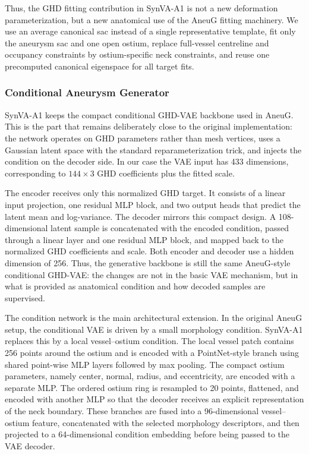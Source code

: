 Thus, the GHD fitting contribution in SynVA-A1 is not a new deformation
parameterization, but a new anatomical use of the AneuG fitting machinery. We
use an average canonical sac instead of a single representative template, fit
only the aneurysm sac and one open ostium, replace full-vessel centreline and
occupancy constraints by ostium-specific neck constraints, and reuse one
precomputed canonical eigenspace for all target fits.

\subsubsection{Conditional Aneurysm Generator}

SynVA-A1 keeps the compact conditional GHD-VAE backbone used in AneuG. This is
the part that remains deliberately close to the original implementation: the
network operates on GHD parameters rather than mesh vertices, uses a Gaussian
latent space with the standard reparameterization trick, and injects the
condition on the decoder side. In our case the VAE input has 433 dimensions,
corresponding to $144\times3$ GHD coefficients plus the fitted scale.

The encoder receives only this normalized GHD target. It consists of a linear
input projection, one residual MLP block, and two output heads that predict the
latent mean and log-variance. The decoder mirrors this compact design. A
108-dimensional latent sample is concatenated with the encoded condition,
passed through a linear layer and one residual MLP block, and mapped back to
the normalized GHD coefficients and scale. Both encoder and decoder use a
hidden dimension of 256. Thus, the generative backbone is still the same
AneuG-style conditional GHD-VAE: the changes are not in the basic VAE
mechanism, but in what is provided as anatomical condition and how decoded
samples are supervised.

The condition network is the main architectural extension. In the original
AneuG setup, the conditional VAE is driven by a small morphology condition.
SynVA-A1 replaces this by a local vessel--ostium condition. The local vessel
patch contains 256 points around the ostium and is encoded with a
PointNet-style branch using shared point-wise MLP layers followed by max
pooling. The compact ostium parameters, namely center, normal, radius, and
eccentricity, are encoded with a separate MLP. The ordered ostium ring is
resampled to 20 points, flattened, and encoded with another MLP so that the
decoder receives an explicit representation of the neck boundary. These
branches are fused into a 96-dimensional vessel--ostium feature, concatenated
with the selected morphology descriptors, and then projected to a
64-dimensional condition embedding before being passed to the VAE decoder.

